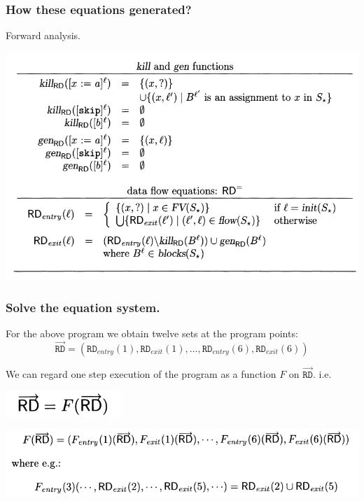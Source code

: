 \documentclass[aspectratio=1610, 13pt]{beamer}
\begin{document}
\begin{frame}\frametitle{How these equations generated?}
Forward analysis.
\begin{center}
\includegraphics[scale=0.4]{rd_analysis.png}
\end{center}
\end{frame}

\begin{frame}\frametitle{Solve the equation system.}
For the above program we obtain twelve sets at the program points:
\[\vec{\texttt{RD}} = (\texttt{RD}_{entry}(1), \texttt{RD}_{exit}(1), \ldots, \texttt{RD}_{entry}(6), \texttt{RD}_{exit}(6))\]

We can regard one step execution of the program as a function $F$ on $\vec{\texttt{RD}}$. i.e. 

\begin{center}
\includegraphics[scale=0.4]{eq_system.png}

\includegraphics[scale=0.4]{eq_system_example.png}
\end{center}

\end{frame}
\end{document}
